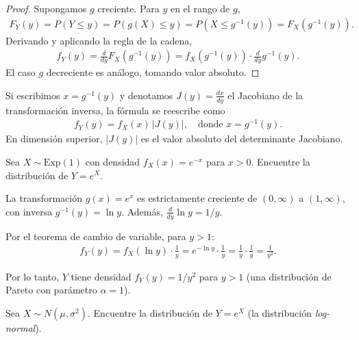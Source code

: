 \begin{proof}
Supongamos $g$ creciente. Para $y$ en el rango de $g$,
\begin{align}
 F_Y(y) = P(Y \leq y) = P(g(X) \leq y) = P(X \leq g^{-1}(y)) = F_X(g^{-1}(y)).
\end{align}
Derivando y aplicando la regla de la cadena,
\begin{align}
 f_Y(y) = \frac{d}{dy} F_X(g^{-1}(y)) = f_X(g^{-1}(y)) \cdot \frac{d}{dy} g^{-1}(y).
\end{align}
El caso $g$ decreciente es an\'alogo, tomando valor absoluto.
\end{proof}

\begin{observacion}
Si escribimos $x = g^{-1}(y)$ y denotamos $J(y) = \frac{dx}{dy}$ el Jacobiano de la
transformaci\'on inversa, la f\'ormula se reescribe como
\begin{align}
 \label{eq:3.2.4}
 f_Y(y) = f_X(x)\,|J(y)|, \quad \text{donde } x = g^{-1}(y).
\end{align}
En dimensi\'on superior, $|J(y)|$ es el valor absoluto del determinante Jacobiano.
\end{observacion}

\begin{ejemplo}
 \label{exmp:3.2.2}
Sea $X \sim \text{Exp}(1)$ con densidad $f_X(x) = e^{-x}$ para $x > 0$. Encuentre la
distribuci\'on de $Y = e^X$.
\end{ejemplo}

\begin{solucion}
La transformaci\'on $g(x) = e^x$ es estrictamente creciente de $(0, \infty)$ a
$(1, \infty)$, con inversa $g^{-1}(y) = \ln y$. Adem\'as, $\frac{d}{dy}\ln y = 1/y$.

Por el teorema de cambio de variable, para $y > 1$:
\begin{align}
 f_Y(y) = f_X(\ln y) \cdot \frac{1}{y} = e^{-\ln y} \cdot \frac{1}{y} = \frac{1}{y} \cdot \frac{1}{y} = \frac{1}{y^2}.
\end{align}

Por lo tanto, $Y$ tiene densidad $f_Y(y) = 1/y^2$ para $y > 1$ (una distribuci\'on
de Pareto con par\'ametro $\alpha = 1$).
\end{solucion}

\begin{ejemplo}
 \label{exmp:3.2.3}
Sea $X \sim N(\mu, \sigma^2)$. Encuentre la distribuci\'on de $Y = e^X$ (la
distribuci\'on \emph{log-normal}).
\end{ejemplo}

